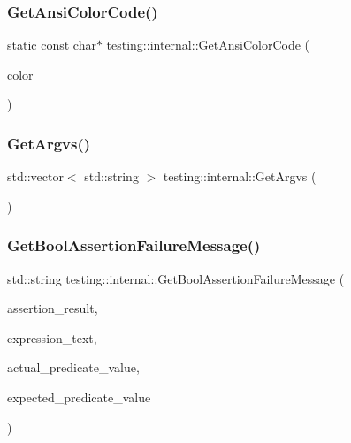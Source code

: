 \mbox{\label{namespacetesting_1_1internal_a27e2b771bd01c527d3e9c232a346315f}} 
\subsubsection{\texorpdfstring{GetAnsiColorCode()}{GetAnsiColorCode()}}
{\footnotesize\ttfamily static const char$\ast$ testing\+::internal\+::\+Get\+Ansi\+Color\+Code (\begin{DoxyParamCaption}\item[{\mbox{\hyperlink{namespacetesting_1_1internal_a648c1bc94c2ef9e868ff3f9dff0f9c4e}{G\+Test\+Color}}}]{color }\end{DoxyParamCaption})\hspace{0.3cm}{\ttfamily [static]}}

\mbox{\label{namespacetesting_1_1internal_a9608256c67f889006be44912e57e3d4f}} 
\subsubsection{\texorpdfstring{GetArgvs()}{GetArgvs()}}
{\footnotesize\ttfamily std\+::vector$<$ std\+::string $>$ testing\+::internal\+::\+Get\+Argvs (\begin{DoxyParamCaption}{ }\end{DoxyParamCaption})}

\mbox{\label{namespacetesting_1_1internal_a5fd6e5dc9eb20ab3c3a80e24d89dfac6}} 
\subsubsection{\texorpdfstring{GetBoolAssertionFailureMessage()}{GetBoolAssertionFailureMessage()}}
{\footnotesize\ttfamily std\+::string testing\+::internal\+::\+Get\+Bool\+Assertion\+Failure\+Message (\begin{DoxyParamCaption}\item[{const Assertion\+Result \&}]{assertion\+\_\+result,  }\item[{const char $\ast$}]{expression\+\_\+text,  }\item[{const char $\ast$}]{actual\+\_\+predicate\+\_\+value,  }\item[{const char $\ast$}]{expected\+\_\+predicate\+\_\+value }\end{DoxyParamCaption})}

